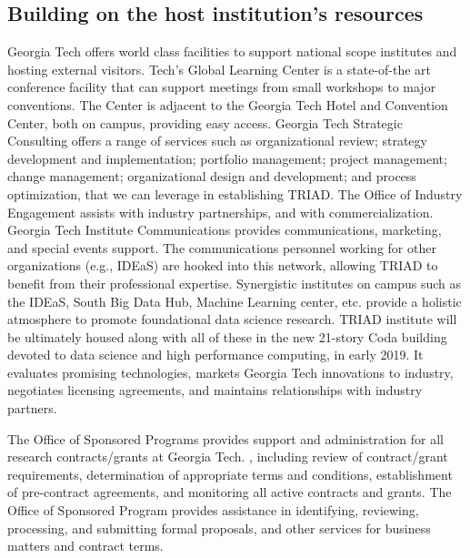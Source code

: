 \documentclass[12pt]{article}
\begin{document}
\subsection{Building on the host institution's resources}
\label{sec:leverage}
Georgia Tech offers world class facilities to support national scope institutes and hosting
external visitors. Tech's Global Learning Center is a state-of-the art conference facility that can support meetings from small workshops to major conventions. The Center is adjacent
to the Georgia Tech Hotel and Convention Center, both on campus, providing easy access. Georgia Tech Strategic Consulting offers a range of services such as organizational review; strategy development and implementation; portfolio management; project management; change management; organizational design and development; and process optimization, that we can
leverage in establishing TRIAD. The Office of Industry Engagement assists with industry
partnerships, and with commercialization. Georgia Tech Institute Communications provides communications, marketing, and special events support. The communications personnel working
for other organizations (e.g., IDEaS) are hooked into this network, allowing TRIAD to benefit
from their professional expertise. Synergistic institutes on campus such as the IDEaS, South
Big Data Hub, Machine Learning center, etc. provide a holistic atmosphere to promote foundational data science research. TRIAD institute will be ultimately housed along with all of these in the new 21-story Coda building devoted to data science and high performance computing, in early 2019.
It evaluates promising technologies, markets Georgia Tech innovations to industry, negotiates licensing agreements, and maintains relationships with industry partners.


The Office of Sponsored Programs provides support and administration for all research contracts/grants at Georgia Tech.
, including review of contract/grant requirements, determination of appropriate terms and conditions, establishment of pre-contract agreements, and monitoring all active contracts and grants.
The Office of Sponsored Program provides assistance in identifying, reviewing, processing, and submitting formal proposals, and other services for business matters and contract terms.
\end{document}
